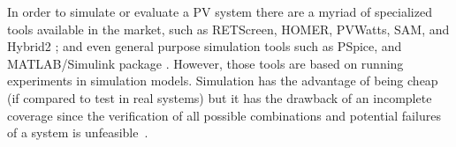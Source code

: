 \documentclass[review]{elsarticle}
\begin{document}
In order to simulate or evaluate a PV system there are a myriad of specialized tools available in the market, such as RETScreen, HOMER, PVWatts, SAM, and Hybrid2 \citep{Pradhan,Swarnkar,NRELDobos,NRELBlair,Mills}; and even general purpose simulation tools such as PSpice, and MATLAB/Simulink package \citep{Gow1999,Benatiallah2017}.
%
%
%
%
%
However, those tools are based on running experiments in simulation models. Simulation has the advantage of being cheap (if compared to test in real systems) %
but it has the drawback of an incomplete coverage since the verification of all possible combinations and potential failures of a system is unfeasible~\citep{ClarkeHV18}.
\end{document}
